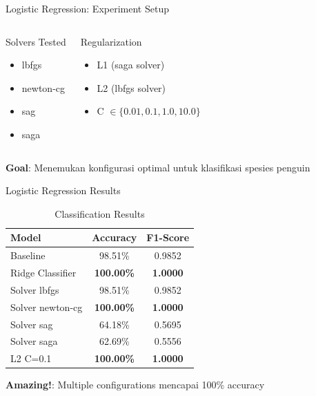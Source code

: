 \documentclass[aspectratio=169]{beamer}
\newcommand{\hl}[1]{\textcolor{AWSOrange}{\textbf{#1}}}
\newcommand{\hlg}[1]{\textcolor{AWSGreen}{\textbf{#1}}}
\newcommand{\hly}[1]{\textcolor{AWSYellow}{\textbf{#1}}}
\begin{document}
\begin{frame}{Logistic Regression: Experiment Setup}
\fontsize{10}{11}\selectfont

\begin{columns}
\begin{block}{Solvers Tested}
\begin{itemize}
    \item lbfgs
    \item newton-cg
    \item sag
    \item saga
\end{itemize}
\end{block}

\begin{block}{Regularization}
\begin{itemize}
    \item L1 (saga solver)
    \item L2 (lbfgs solver)
    \item C $\in \{0.01, 0.1, 1.0, 10.0\}$
\end{itemize}
\end{block}
\end{columns}

\vspace{0.2in}
\hly{Goal}: Menemukan konfigurasi optimal untuk klasifikasi spesies penguin
\end{frame}

\begin{frame}{Logistic Regression Results}
\fontsize{10}{11}\selectfont

\begin{table}[htbp]
\centering
\caption{Classification Results}
\begin{tabular}{lcc}
\toprule
Model & Accuracy & F1-Score \\
\midrule
Baseline & 98.51\% & 0.9852 \\
Ridge Classifier & \hlg{\textbf{100.00\%}} & \textbf{1.0000} \\
Solver lbfgs & 98.51\% & 0.9852 \\
Solver newton-cg & \hlg{\textbf{100.00\%}} & \textbf{1.0000} \\
Solver sag & 64.18\% & 0.5695 \\
Solver saga & 62.69\% & 0.5556 \\
L2 C=0.1 & \hlg{\textbf{100.00\%}} & \textbf{1.0000} \\
\bottomrule
\end{tabular}
\end{table}

\hl{Amazing!}: Multiple configurations mencapai 100\% accuracy
\end{frame}
\end{document}

